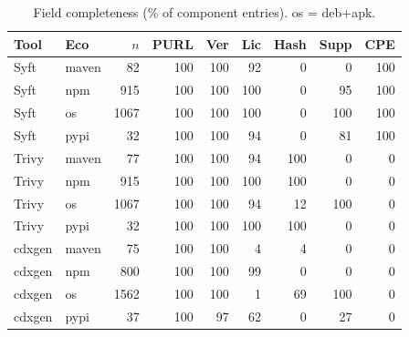 \begin{table}[t]\centering\caption{Field completeness (\% of component entries). os = deb+apk.}\label{tab:fields}
\scriptsize\setlength{\tabcolsep}{3pt}\begin{tabular}{llrrrrrrr}\toprule
Tool & Eco & $n$ & PURL & Ver & Lic & Hash & Supp & CPE \\\midrule
Syft & maven & 82 & 100 & 100 & 92 & 0 & 0 & 100 \\
Syft & npm & 915 & 100 & 100 & 100 & 0 & 95 & 100 \\
Syft & os & 1067 & 100 & 100 & 100 & 0 & 100 & 100 \\
Syft & pypi & 32 & 100 & 100 & 94 & 0 & 81 & 100 \\
Trivy & maven & 77 & 100 & 100 & 94 & 100 & 0 & 0 \\
Trivy & npm & 915 & 100 & 100 & 100 & 100 & 0 & 0 \\
Trivy & os & 1067 & 100 & 100 & 94 & 12 & 100 & 0 \\
Trivy & pypi & 32 & 100 & 100 & 100 & 100 & 0 & 0 \\
cdxgen & maven & 75 & 100 & 100 & 4 & 4 & 0 & 0 \\
cdxgen & npm & 800 & 100 & 100 & 99 & 0 & 0 & 0 \\
cdxgen & os & 1562 & 100 & 100 & 1 & 69 & 100 & 0 \\
cdxgen & pypi & 37 & 100 & 97 & 62 & 0 & 27 & 0 \\
\bottomrule\end{tabular}\end{table}
